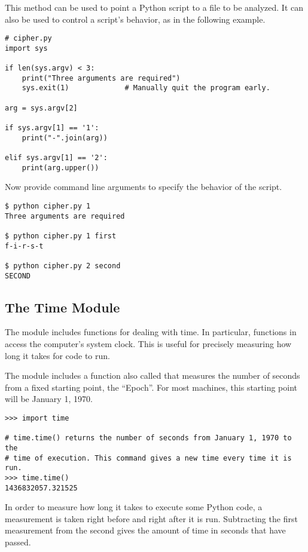 This method can be used to point a Python script to a file to be analyzed.
It can also be used to control a script's behavior, as in the following example.

\begin{lstlisting}
# cipher.py
import sys

if len(sys.argv) < 3:
    print("Three arguments are required")
    sys.exit(1)             # Manually quit the program early.

arg = sys.argv[2]

if sys.argv[1] == '1':
    print("-".join(arg))

elif sys.argv[1] == '2':
    print(arg.upper())
\end{lstlisting}

Now provide command line arguments to specify the behavior of the script.

\begin{lstlisting}
$ python cipher.py 1
Three arguments are required

$ python cipher.py 1 first
f-i-r-s-t

$ python cipher.py 2 second
SECOND
\end{lstlisting}

\subsection*{The Time Module}

The  module includes functions for dealing with time.
In particular, functions in  access the computer's system clock.
This is useful for precisely measuring how long it takes for code to run.

The  module includes a function also called  that measures the number of seconds from a fixed starting point, the ``Epoch''.
For most machines, this starting point will be January 1, 1970.

\begin{lstlisting}
>>> import time

# time.time() returns the number of seconds from January 1, 1970 to the
# time of execution. This command gives a new time every time it is run.
>>> time.time()
1436832057.321525
\end{lstlisting}

In order to measure how long it takes to execute some Python code, a measurement is taken right before and right after it is run.
Subtracting the first measurement from the second gives the amount of time in seconds that have passed.

